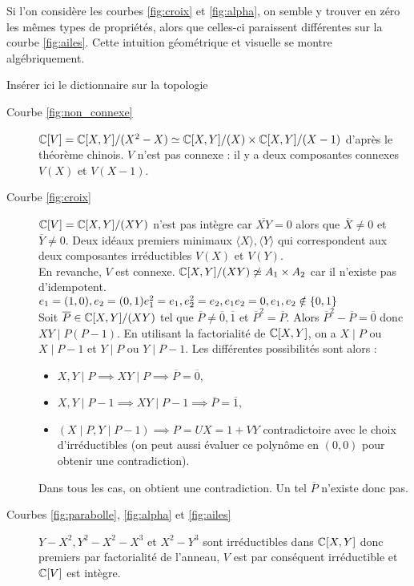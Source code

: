 \begin{exemple}
  Si l'on considère les courbes \ref{fig:croix} et \ref{fig:alpha}, on
  semble y trouver en zéro les mêmes types de propriétés, alors que
  celles-ci paraissent différentes sur la courbe
  \ref{fig:ailes}. Cette intuition géométrique et visuelle se montre
  algébriquement.
\end{exemple}


Insérer ici le dictionnaire sur la topologie

\begin{exemple}
  \begin{description}
  \item[Courbe \ref{fig:non_connexe} ] $\mathbb{C}[V]=\mathbb{C}[X,Y]/(X^2-X)\simeq
    \mathbb{C}[X,Y]/(X) \times \mathbb{C}[X,Y]/(X-1)$ d'après le théorème chinois.
    $V$ n'est pas connexe : il y a deux composantes connexes $V(X)$ et
    $V(X-1)$.
  \item[Courbe \ref{fig:croix}] $\mathbb{C}[V] = \mathbb{C}[X,Y]/(XY)$ n'est pas
    intègre car $\overline{XY}=0$ alors que $\overline{X}\neq 0$ et
    $\overline{Y}\neq 0$.  Deux idéaux premiers minimaux
    $\langle X\rangle,\langle Y\rangle$ qui correspondent aux deux
    composantes irréductibles $V(X)$ et
    $V(Y)$.\\
    En revanche, $V$ est connexe.
    $\mathbb{C}[X,Y]/(XY)\not\simeq A_1\times A_2$ car il n'existe pas
    d'idempotent.\\
    $e_1=(1,0), e_2=(0,1)\\
    e_1^2 = e_1, e_2^2=e_2, e_1e_2=0, e_1,e_2\notin\{0,1\}$\\
    Soit $\overline{P}\in\mathbb{C}[X,Y]/(XY)$ tel que
    $\overline{P}\neq \overline{0},\overline{1}$ et
    $\overline{P}^2=\overline{P}$. Alors
    $\overline{P}^2-\overline{P}=\overline{0}$ donc $XY\mid P(P-1)$.
    En utilisant la factorialité de $\mathbb{C}[X,Y]$, on a $X\mid P$ ou
    $X\mid P-1$ et $Y\mid P$ ou $Y\mid P-1$. Les différentes
    possibilités sont alors :
    \begin{itemize}
    \item $X,Y\mid P\implies XY\mid P\implies
      \overline{P}=\overline{0}$,
    \item $X,Y\mid P-1\implies XY\mid P-1\implies
      \overline{P}=\overline{1}$,
    \item $(X\mid P, Y\mid P-1)\implies P=UX=1+VY$ contradictoire avec le
    choix d'irréductibles (on peut aussi évaluer ce polynôme en
    $(0,0)$ pour obtenir une contradiction).
  \end{itemize}
  Dans tous les cas, on obtient une contradiction. Un tel
  $\overline{P}$ n'existe donc pas.
\item[Courbes \ref{fig:parabolle}, \ref{fig:alpha} et
  \ref{fig:ailes}] $Y-X^2, Y^2-X^2-X^3$ et $X^2-Y^3$ sont
  irréductibles dans $\mathbb{C}[X,Y]$ donc premiers par factorialité de
  l'anneau, $V$ est par conséquent irréductible et $\mathbb{C}[V]$ est intègre.    
\end{description}
\end{exemple}

